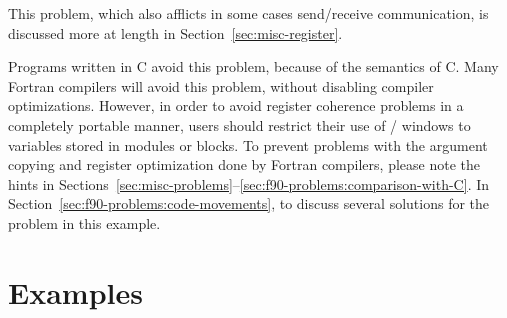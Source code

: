 This problem, which also afflicts in some cases
send/receive communication, is discussed more at length in 
Section~\ref{sec:misc-register}.

Programs written in C avoid this problem, because of the semantics of C. 
Many Fortran compilers will avoid this
problem, without disabling compiler optimizations.
However, in order to avoid register coherence problems in a completely
portable manner, users should  restrict
their use of \RMA/ windows to variables stored in 
modules or  blocks.
To prevent problems with the argument copying and register
optimization done by Fortran compilers, please note the hints in 
Sections~\ref{sec:misc-problems}--\ref{sec:f90-problems:comparison-with-C}.
In Section~\ref{sec:f90-problems:code-movements},
 to 
discuss several solutions for the problem in this example.


\section{Examples}
\label{sec:onesided_examples}

